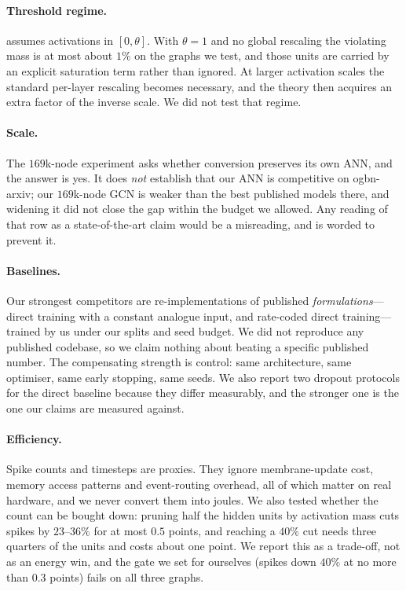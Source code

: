 \paragraph{Threshold regime.}  assumes activations in $[0,\theta]$. With
$\theta = 1$ and no global rescaling the violating mass is at most about $1\%$ on the graphs we test,
and those units are carried by an explicit saturation term rather than ignored. At larger activation
scales the standard per-layer rescaling becomes necessary, and the theory then acquires an extra
factor of the inverse scale. We did not test that regime.

\paragraph{Scale.} The $169$k-node experiment asks whether conversion preserves its own ANN, and the
answer is yes. It does \emph{not} establish that our ANN is competitive on ogbn-arxiv; our
$169$k-node GCN is weaker than the best published models there, and widening it did not close the gap
within the budget we allowed. Any reading of that row as a state-of-the-art claim would be a
misreading, and  is worded to prevent it.

\paragraph{Baselines.} Our strongest competitors are re-implementations of published
\emph{formulations}---direct training with a constant analogue input, and rate-coded direct
training---trained by us under our splits and seed budget. We did not reproduce any published
codebase, so we claim nothing about beating a specific published number. The compensating strength is
control: same architecture, same optimiser, same early stopping, same seeds. We also report two
dropout protocols for the direct baseline because they differ measurably, and the stronger one is the
one our claims are measured against.

\paragraph{Efficiency.} Spike counts and timesteps are proxies. They ignore membrane-update cost, memory access patterns and event-routing overhead, all of which matter on real hardware, and we never convert them into joules. We also tested whether the count can be bought down: pruning half the hidden units by activation mass cuts spikes by $23$--$36\%$ for at most $0.5$ points, and reaching a $40\%$ cut needs three quarters of the units and costs about one point. We report this as a trade-off, not as an energy win, and the gate we set for ourselves (spikes down $40\%$ at no more than $0.3$ points) fails on all three graphs.

